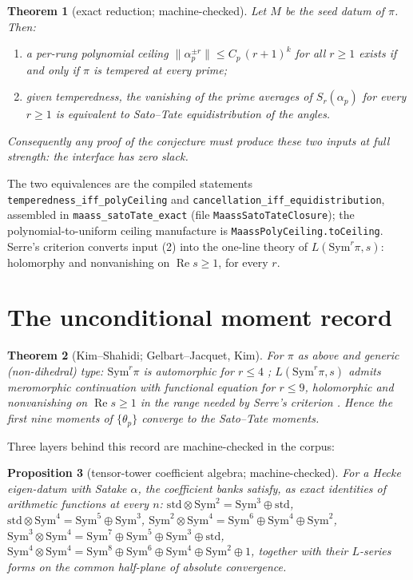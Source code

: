 \documentclass[11pt]{article}
\newtheorem{theorem}{Theorem}[section]
\newtheorem{proposition}[theorem]{Proposition}
\theoremstyle{definition}
\theoremstyle{remark}
\newcommand{\Sym}{\mathrm{Sym}}
\renewcommand{\Re}{\operatorname{Re}}
\begin{document}
\begin{theorem}[exact reduction; machine-checked]\label{thm:reduction}
Let $M$ be the seed datum of $\pi$.  Then:
\begin{enumerate}
\item a per-rung polynomial ceiling
$\|\alpha_p^{\pm r}\|\le C_p\,(r+1)^k$ for all $r\ge 1$ exists \emph{if and
only if} $\pi$ is tempered at every prime;
\item given temperedness, the vanishing of the prime averages of
$S_r(\alpha_p)$ for every $r\ge1$ is \emph{equivalent} to Sato--Tate
equidistribution of the angles.
\end{enumerate}
Consequently any proof of the conjecture must produce these two inputs at
full strength: the interface has zero slack.
\end{theorem}

The two equivalences are the compiled statements
\texttt{temperedness\_iff\_polyCeiling} and
\texttt{cancellation\_iff\_equidistribution}, assembled in
\texttt{maass\_satoTate\_exact} (file \texttt{MaassSatoTateClosure}); the
polynomial-to-uniform ceiling manufacture is
\texttt{MaassPolyCeiling.toCeiling}.  Serre's criterion \cite{Serre} converts
input (2) into the one-line theory of $L(\Sym^r\pi,s)$: holomorphy and
nonvanishing on $\Re s\ge 1$, for every $r$.

\section{The unconditional moment record}\label{sec:record}

\begin{theorem}[Kim--Shahidi; Gelbart--Jacquet, Kim]\label{thm:record}
For $\pi$ as above and generic (non-dihedral) type:
$\Sym^r\pi$ is automorphic for $r\le 4$
\cite{GJ,KimShahidiAnnals,KimJAMS}; $L(\Sym^r\pi,s)$ admits meromorphic
continuation with functional equation for $r\le 9$, holomorphic and
nonvanishing on $\Re s\ge 1$ in the range needed by Serre's criterion
\cite{KimShahidiDuke,KimShahidiIMRN}.  Hence the first nine moments of
$\{\theta_p\}$ converge to the Sato--Tate moments.
\end{theorem}

Three layers behind this record are machine-checked in the corpus:

\begin{proposition}[tensor-tower coefficient algebra; machine-checked]
\label{prop:tower}
For a Hecke eigen-datum with Satake $\alpha$, the coefficient banks satisfy,
as exact identities of arithmetic functions at every $n$:
$\mathrm{std}\otimes\Sym^2=\Sym^3\oplus\mathrm{std}$,
$\mathrm{std}\otimes\Sym^4=\Sym^5\oplus\Sym^3$,
$\Sym^2\otimes\Sym^4=\Sym^6\oplus\Sym^4\oplus\Sym^2$,
$\Sym^3\otimes\Sym^4=\Sym^7\oplus\Sym^5\oplus\Sym^3\oplus\mathrm{std}$,
$\Sym^4\otimes\Sym^4=\Sym^8\oplus\Sym^6\oplus\Sym^4\oplus\Sym^2\oplus 1$,
together with their $L$-series forms on the common half-plane of absolute
convergence.
\end{proposition}
\end{document}
